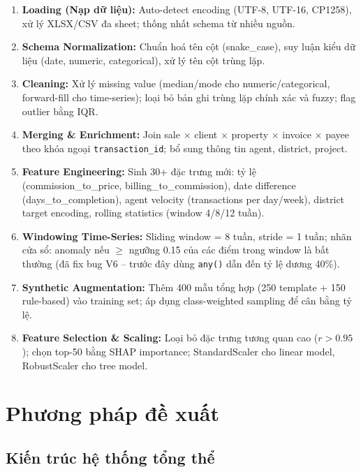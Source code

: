 \begin{enumerate}
  \item \textbf{Loading (Nạp dữ liệu):} Auto-detect encoding (UTF-8, UTF-16, CP1258), xử lý XLSX/CSV đa sheet; thống nhất schema từ nhiều nguồn.

  \item \textbf{Schema Normalization:} Chuẩn hoá tên cột (snake\_case), suy luận kiểu dữ liệu (date, numeric, categorical), xử lý tên cột trùng lặp.

  \item \textbf{Cleaning:} Xử lý missing value (median/mode cho numeric/categorical, forward-fill cho time-series); loại bỏ bản ghi trùng lặp chính xác và fuzzy; flag outlier bằng IQR.

  \item \textbf{Merging \& Enrichment:} Join sale $\times$ client $\times$ property $\times$ invoice $\times$ payee theo khóa ngoại \texttt{transaction\_id}; bổ sung thông tin agent, district, project.

  \item \textbf{Feature Engineering:} Sinh 30+ đặc trưng mới: tỷ lệ (commission\_to\_price, billing\_to\_commission), date difference (days\_to\_completion), agent velocity (transactions per day/week), district target encoding, rolling statistics (window 4/8/12 tuần).

  \item \textbf{Windowing Time-Series:} Sliding window = 8 tuần, stride = 1 tuần; nhãn cửa sổ: anomaly nếu $\geq$ ngưỡng 0.15 của các điểm trong window là bất thường (đã fix bug V6 -- trước đây dùng \texttt{any()} dẫn đến tỷ lệ dương 40\%).

  \item \textbf{Synthetic Augmentation:} Thêm 400 mẫu tổng hợp (250 template + 150 rule-based) vào training set; áp dụng class-weighted sampling để cân bằng tỷ lệ.

  \item \textbf{Feature Selection \& Scaling:} Loại bỏ đặc trưng tương quan cao ($r > 0.95$); chọn top-50 bằng SHAP importance; StandardScaler cho linear model, RobustScaler cho tree model.
\end{enumerate}

\section{Phương pháp đề xuất}

\subsection{Kiến trúc hệ thống tổng thể}

